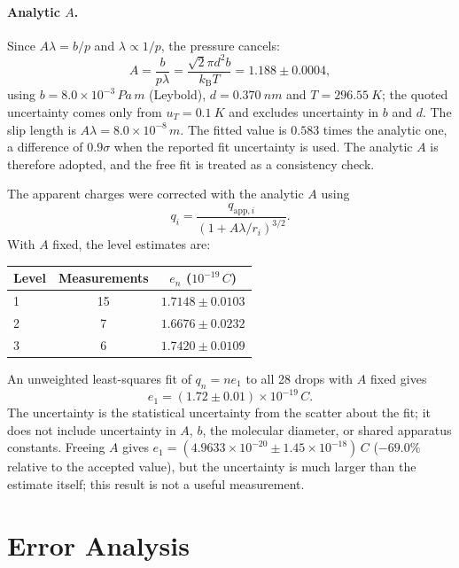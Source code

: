 \documentclass[12pt,a4paper]{article}
\begin{document}
\paragraph{Analytic $A$.} Since $A\lambda=b/p$ and $\lambda\propto 1/p$, the
pressure cancels:
\begin{equation}
    A=\frac{b}{p\lambda}=\frac{\sqrt{2}\pi d^2 b}{k_{\mathrm{B}}T}
    =1.188\pm0.0004,
\end{equation}
using $b=8.0\times10^{-3}\,\si{Pa\,m}$ (Leybold), $d=\SI{0.370}{nm}$ and
$T=\SI{296.55}{K}$; the quoted uncertainty comes only from $u_T=\SI{0.1}{K}$
and excludes uncertainty in $b$ and $d$. The slip length is
$A\lambda=8.0\times10^{-8}\,\si{m}$. The fitted value is $0.583$ times the
analytic one, a difference of $0.9\sigma$ when the reported fit uncertainty
is used. The analytic $A$ is therefore adopted, and the free fit is treated
as a consistency check.

The apparent charges were corrected with the analytic $A$ using
\begin{equation}
    q_i=\frac{q_{\mathrm{app},i}}{(1+A\lambda/r_i)^{3/2}}.
\end{equation}
With $A$ fixed, the level estimates are:
\begin{center}
\begin{tabular}{lcc}
    \toprule
    Level & Measurements & $e_n$ ($10^{-19}\,\si{C}$) \\
    \midrule
    1 & 15 & $1.7148\pm0.0103$ \\
    2 & 7  & $1.6676\pm0.0232$ \\
    3 & 6  & $1.7420\pm0.0109$ \\
    \bottomrule
\end{tabular}
\end{center}
An unweighted least-squares fit of $q_n=ne_1$ to all 28 drops with $A$ fixed gives
\begin{equation}
    e_1=(1.72\pm0.01)\times10^{-19}\,\si{C}.
\end{equation}
The uncertainty is the statistical uncertainty from the scatter about the fit; it does not include
uncertainty in $A$, $b$, the molecular diameter, or shared apparatus
constants. Freeing $A$ gives
$e_1=(4.9633\times10^{-20}\pm1.45\times10^{-18})\,\si{C}$
($-69.0\%$ relative to the accepted value), but the uncertainty is much larger
than the estimate itself; this result is not a useful measurement.

\newpage

\section{Error Analysis}
\end{document}
